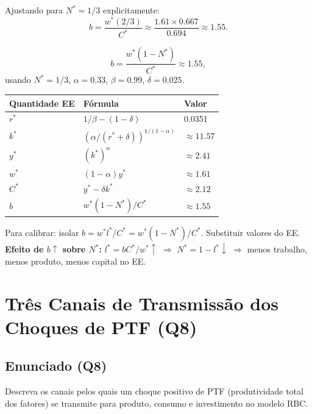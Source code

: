 \documentclass[12pt, a4paper]{article}
\begin{document}
Ajustando para $N^*=1/3$ explicitamente:
\[
b = \frac{w^*(2/3)}{C^*} \approx \frac{1.61\times 0.667}{0.694} \approx 1.55.
\]

\begin{resultbox}[title={Calibração do Parâmetro $b$}]
\[
b = \frac{w^*(1-N^*)}{C^*} \approx 1.55,
\]
usando $N^* = 1/3$, $\alpha=0.33$, $\beta=0.99$, $\delta=0.025$.
\end{resultbox}

\begin{center}
\begin{tabular}{lll}
\toprule
Quantidade EE & Fórmula & Valor \\
\midrule
$r^*$ & $1/\beta - (1-\delta)$ & 0.0351 \\
$k^*$ & $(\alpha/(r^*+\delta))^{1/(1-\alpha)}$ & $\approx 11.57$ \\
$y^*$ & $(k^*)^\alpha$ & $\approx 2.41$ \\
$w^*$ & $(1-\alpha)y^*$ & $\approx 1.61$ \\
$C^*$ & $y^*-\delta k^*$ & $\approx 2.12$ \\
$b$ & $w^*(1-N^*)/C^*$ & $\approx 1.55$ \\
\bottomrule
\end{tabular}
\end{center}

\begin{provabox}[title={Q7 --- Calibração e Efeito de $b\uparrow$}]
Para calibrar: isolar $b = w^*l^*/C^* = w^*(1-N^*)/C^*$. Substituir valores do EE.\\
\textbf{Efeito de $b\uparrow$ sobre $N^*$:} $l^* = bC^*/w^*\uparrow$ $\Rightarrow$ $N^* = 1-l^*\downarrow$ $\Rightarrow$ menos trabalho, menos produto, menos capital no EE.
\end{provabox}

\section{Três Canais de Transmissão dos Choques de PTF (Q8)}

\subsection*{Enunciado (Q8)}

Descreva os canais pelos quais um choque positivo de PTF (produtividade total dos fatores) se transmite para produto, consumo e investimento no modelo RBC.
\end{document}
